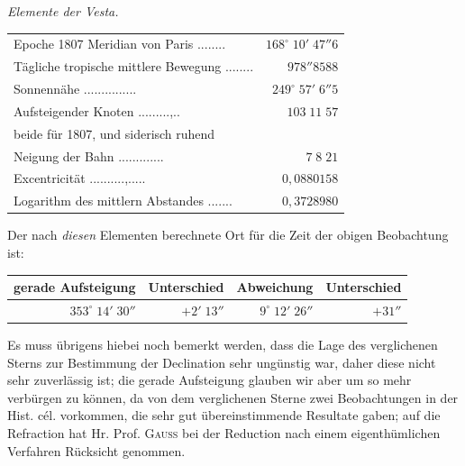 \begin{center}
\emph{Elemente der Vesta.}
\end{center}


\begin{center}\fontsize{9}{11}\selectfont\setlength{\tabcolsep}{3pt}\renewcommand{\arraystretch}{1.15}\begin{tabular}{lr}
Epoche 1807 Meridian von Paris .\;.\;.\;.\;.\;.\;.\;.\; & $168^\circ\;10'\;47''6$\\
Tägliche tropische mittlere Bewegung .\;.\;.\;.\;.\;.\;.\;.\; & $978''8588$\\
Sonnennähe .\;.\;.\;.\;.\;.\;.\;.\;.\;.\;.\;.\;.\;.\;.\; & $249^\circ\;57'\;6''5$\\
Aufsteigender Knoten .\;.\;.\;.\;.\;.\;.\;.\;.\;,\;.\;.\; & $103\;11\;57$\\
\multicolumn{2}{l}{\quad beide für 1807, und siderisch ruhend}\\
Neigung der Bahn .\;.\;.\;.\;.\;.\;.\;.\;.\;.\;.\;.\;.\; & $7\;8\;21$\\
Excentricität .\;.\;.\;.\;.\;.\;.\;.\;.\;.\;,\;.\;.\;.\;.\;.\; & $0{,}0880158$\\
Logarithm des mittlern Abstandes .\;.\;.\;\hspace{.5em}.\;.\;.\;.\; & $0{,}3728980$\\
\end{tabular}\end{center}


\par\indent Der nach \emph{diesen} Elementen berechnete Ort für die Zeit der obigen Beobachtung
ist:


\begin{center}\fontsize{10}{12}\selectfont\setlength{\tabcolsep}{3pt}\renewcommand{\arraystretch}{1.15}\begin{tabular}{rrrr}
gerade Aufsteigung & Unterschied & Abweichung & Unterschied\\\hline
$353^\circ\;14'\;30''$ & $+2'\;13''$ & $9^\circ\;12'\;26''$ & $+31''$\\
\end{tabular}\end{center}


\par\indent Es muss übrigens hiebei noch bemerkt werden, dass die Lage des verglichenen Sterns
zur Bestimmung der Declination sehr ungünstig war, daher diese nicht sehr
zuverlässig ist; die gerade Aufsteigung glauben wir aber um so mehr verbürgen zu
können, da von dem verglichenen Sterne zwei Beobachtungen in der Hist. cél.
vorkommen, die sehr gut übereinstimmende Resultate gaben; auf die Refraction hat
Hr. Prof. \textsc{Gauss} bei der Reduction nach einem eigenthümlichen Verfahren Rücksicht
genommen.


